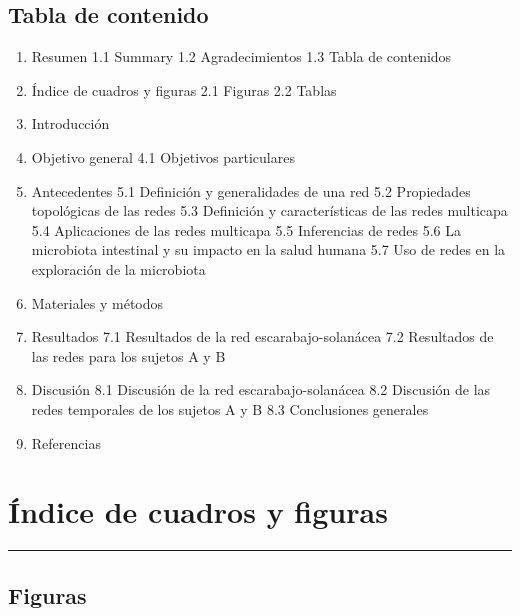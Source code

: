 \documentclass[
]{book}
\providecommand{\tightlist}{%
  \setlength{\itemsep}{0pt}\setlength{\parskip}{0pt}}
\begin{document}
\hypertarget{tabla-de-contenido}{%
\section*{Tabla de contenido}\label{tabla-de-contenido}}

\begin{enumerate}
\def\labelenumi{\arabic{enumi}.}
\tightlist
\item
  Resumen
  1.1 Summary
  1.2 Agradecimientos
  1.3 Tabla de contenidos
\item
  Índice de cuadros y figuras
  2.1 Figuras
  2.2 Tablas
\item
  Introducción
\item
  Objetivo general
  4.1 Objetivos particulares
\item
  Antecedentes
  5.1 Definición y generalidades de una red
  5.2 Propiedades topológicas de las redes
  5.3 Definición y características de las redes multicapa
  5.4 Aplicaciones de las redes multicapa
  5.5 Inferencias de redes
  5.6 La microbiota intestinal y su impacto en la salud humana
  5.7 Uso de redes en la exploración de la microbiota
\item
  Materiales y métodos
\item
  Resultados
  7.1 Resultados de la red escarabajo-solanácea
  7.2 Resultados de las redes para los sujetos A y B
\item
  Discusión
  8.1 Discusión de la red escarabajo-solanácea
  8.2 Discusión de las redes temporales de los sujetos A y B
  8.3 Conclusiones generales
\item
  Referencias
\end{enumerate}

\hypertarget{uxedndice-de-cuadros-y-figuras}{%
\chapter*{Índice de cuadros y figuras}\label{uxedndice-de-cuadros-y-figuras}}

\begin{center}\rule{0.5\linewidth}{0.5pt}\end{center}

\hypertarget{figuras}{%
\section*{Figuras}\label{figuras}}
\end{document}
